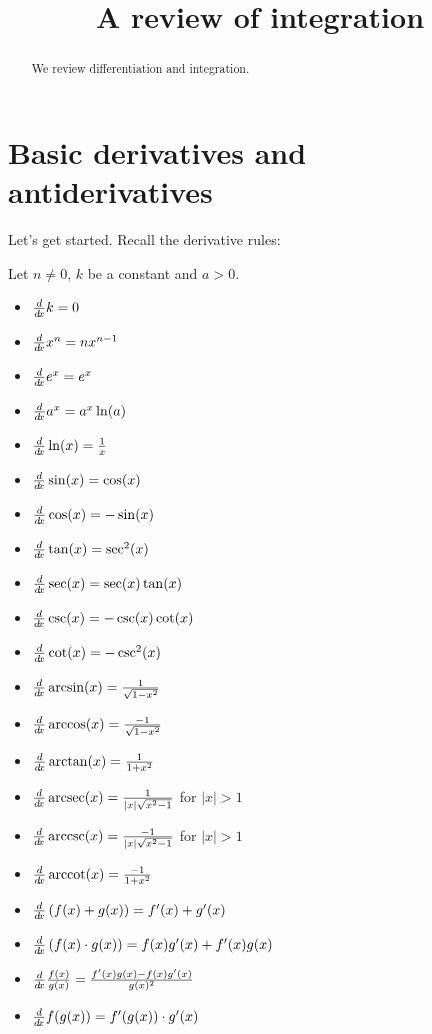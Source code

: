 \documentclass{ximera}
\title[Dig-In:]{A review of integration}
\begin{document}
\begin{abstract}
  We review differentiation and integration.
\end{abstract}
\maketitle


\section{Basic derivatives and antiderivatives}

Let's get started. Recall the derivative rules:

\begin{theorem}
  Let $n\ne 0$, $k$ be a constant and $a>0$.
\begin{itemize}
\item $\frac{d}{\mathop{}\!d\! x} k =0$
\item $\frac{d}{\mathop{}\!d\! x} x^n  = n x^{n-1}$
\item $\frac{d}{\mathop{}\!d\! x} e^x = e^x$
\item $\frac{d}{\mathop{}\!d\! x} a^x = a^x\ln(a)$
\item $\frac{d}{\mathop{}\!d\! x} \ln(x) = \frac{1}{x}$
\item $\frac{d}{\mathop{}\!d\! x} \sin(x) = \cos(x)$
\item $\frac{d}{\mathop{}\!d\! x} \cos(x) = -\sin(x)$  
\item $\frac{d}{\mathop{}\!d\! x} \tan(x) = \sec^2(x)$  
\item $\frac{d}{\mathop{}\!d\! x} \sec(x) = \sec(x)\tan(x)$ 
\item $\frac{d}{\mathop{}\!d\! x} \csc(x) = -\csc(x)\cot(x)$
\item $\frac{d}{\mathop{}\!d\! x} \cot(x) = -\csc^2(x)$
\item $\frac{d}{\mathop{}\!d\! x} \arcsin(x) = \frac{1}{\sqrt{1-x^2}}$
\item $\frac{d}{\mathop{}\!d\! x} \arccos(x) = \frac{-1}{\sqrt{1-x^2}}$
\item $\frac{d}{\mathop{}\!d\! x} \arctan(x) =\frac{1}{1+x^2}$
\item $\frac{d}{\mathop{}\!d\! x} \operatorname{arcsec}(x) = \frac{1}{|x|\sqrt{x^2-1}}$ for $|x|>1$
\item $\frac{d}{\mathop{}\!d\! x} \operatorname{arccsc}(x) = \frac{-1}{|x|\sqrt{x^2-1}}$ for $|x|>1$
\item $\frac{d}{\mathop{}\!d\! x} \operatorname{arccot}(x) = \frac{-1}{1+x^2}$
\item $\frac{d}{\mathop{}\!d\! x} \left( f(x) + g(x) \right) = f'(x) + g'(x)$
\item $\frac{d}{\mathop{}\!d\! x} \left( f(x) \cdot g(x) \right) = f(x)g'(x) + f'(x)g(x)$
\item $\frac{d}{\mathop{}\!d\! x}\frac{f(x)}{g(x)} = \frac{f'(x)g(x) - f(x)g'(x)}{g(x)^2}$
\item $\frac{d}{\mathop{}\!d\! x} f(g(x)) = f'(g(x)) \cdot g'(x)$
\end{itemize}
\end{theorem}
\end{document}
